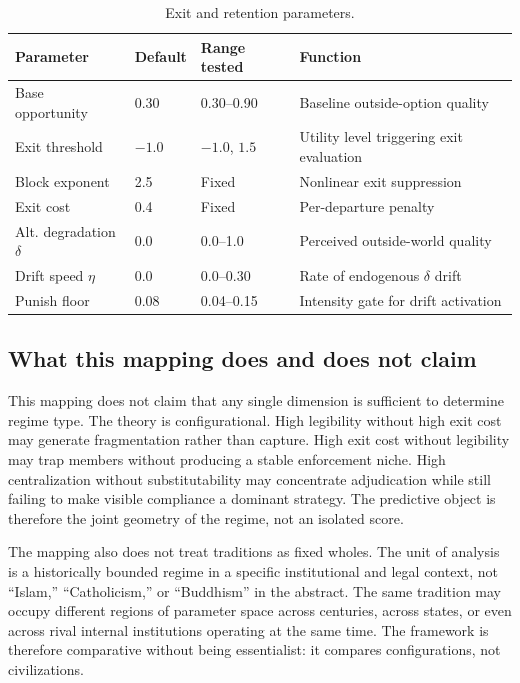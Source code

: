 \documentclass[12pt]{article}
\begin{document}
\begin{table}[ht]
\centering
\caption{Exit and retention parameters.}
\label{tab:exit-params}
\begin{tabular}{llll}
\toprule
Parameter & Default & Range tested & Function \\
\midrule
Base opportunity & 0.30 & 0.30--0.90 & Baseline outside-option quality \\
Exit threshold & $-1.0$ & $-1.0$, $1.5$ & Utility level triggering exit evaluation \\
Block exponent & 2.5 & Fixed & Nonlinear exit suppression \\
Exit cost & 0.4 & Fixed & Per-departure penalty \\
Alt. degradation $\delta$ & 0.0 & 0.0--1.0 & Perceived outside-world quality \\
Drift speed $\eta$ & 0.0 & 0.0--0.30 & Rate of endogenous $\delta$ drift \\
Punish floor & 0.08 & 0.04--0.15 & Intensity gate for drift activation \\
\bottomrule
\end{tabular}
\end{table}

\subsection{What this mapping does and does not claim}

This mapping does not claim that any single dimension is sufficient to determine regime type. The theory is configurational. High legibility without high exit cost may generate fragmentation rather than capture. High exit cost without legibility may trap members without producing a stable enforcement niche. High centralization without substitutability may concentrate adjudication while still failing to make visible compliance a dominant strategy. The predictive object is therefore the joint geometry of the regime, not an isolated score.

The mapping also does not treat traditions as fixed wholes. The unit of analysis is a historically bounded regime in a specific institutional and legal context, not ``Islam,'' ``Catholicism,'' or ``Buddhism'' in the abstract. The same tradition may occupy different regions of parameter space across centuries, across states, or even across rival internal institutions operating at the same time. The framework is therefore comparative without being essentialist: it compares configurations, not civilizations.
\end{document}
